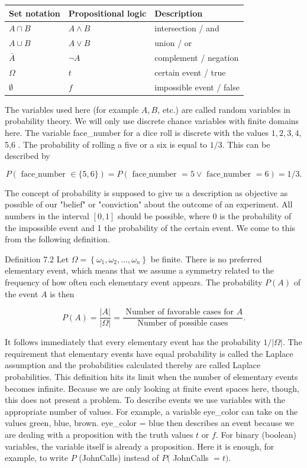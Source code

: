\documentclass[10pt]{book}
\begin{document}
\begin{center}
\begin{tabular}{|l|l|l|}
\hline
Set notation & Propositional logic & Description \\
\hline
$A \cap B$ & $A \wedge B$ & intersection / and \\
\hline
$A \cup B$ & $A \vee B$ & union / or \\
\hline
$\bar{A}$ & $\neg A$ & complement / negation \\
\hline
$\Omega$ & $t$ & certain event / true \\
\hline
$\emptyset$ & $f$ & impossible event / false \\
\hline
\end{tabular}
\end{center}

The variables used here (for example $A, B$, etc.) are called random variables in probability theory. We will only use discrete chance variables with finite domains here. The variable face\_number for a dice roll is discrete with the values $1,2,3,4$, 5,6 . The probability of rolling a five or a six is equal to $1 / 3$. This can be described by

$$
P(\text { face_number } \in\{5,6\})=P(\text { face_number }=5 \vee \text { face_number }=6)=1 / 3 .
$$

The concept of probability is supposed to give us a description as objective as possible of our "belief" or "conviction" about the outcome of an experiment. All numbers in the interval $[0,1]$ should be possible, where 0 is the probability of the impossible event and 1 the probability of the certain event. We come to this from the following definition.

Definition 7.2 Let $\Omega=\left\{\omega_{1}, \omega_{2}, \ldots, \omega_{n}\right\}$ be finite. There is no preferred elementary event, which means that we assume a symmetry related to the frequency of how often each elementary event appears. The probability $P(A)$ of the event $A$ is then

$$
P(A)=\frac{|A|}{|\Omega|}=\frac{\text { Number of favorable cases for } A}{\text { Number of possible cases }} .
$$

It follows immediately that every elementary event has the probability $1 /|\Omega|$. The requirement that elementary events have equal probability is called the Laplace assumption and the probabilities calculated thereby are called Laplace probabilities. This definition hits its limit when the number of elementary events becomes infinite. Because we are only looking at finite event spaces here, though, this does not present a problem. To describe events we use variables with the appropriate number of values. For example, a variable eye\_color can take on the values green, blue, brown. eye\_color = blue then describes an event because we are dealing with a proposition with the truth values $t$ or $f$. For binary (boolean) variables, the variable itself is already a proposition. Here it is enough, for example, to write $P$ (JohnCalls) instead of $P($ JohnCalls $=t)$.
\end{document}
